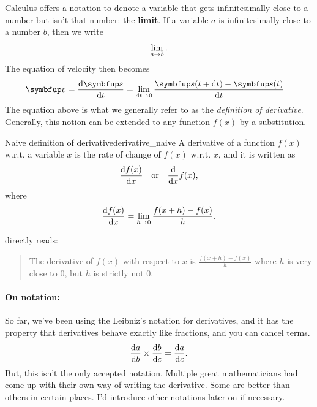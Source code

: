 Calculus offers a notation to denote a variable that gets infinitesimally close to a number but isn't that number: the \textbf{limit}. If a variable \(a\) is infinitesimally close to a number \(b\), then we write
\begin{equation}
  \lim_{a \rightarrow b}.
\end{equation}
The equation of velocity then becomes
\begin{align}
  \vv{v} = \odv{\vv{s}}{t} & = \lim_{\odif{t} \appr 0}\frac{\vv{s}(t + \odif{t}) - \vv{s}(t)}{\odif{t}}
\end{align}
The equation above is what we generally refer to as the \emph{definition of derivative}. Generally, this notion can be extended to any function \(f(x)\) by a substitution.
\begin{df}{Naive definition of derivative}{derivative_naive}
  A derivative of a function \(f(x)\) w.r.t. a variable \(x\) is the rate of change of \(f(x)\) w.r.t. \(x\), and it is written as
  \begin{equation}
    \odv{f(x)}{x} \mathor \odv*{f(x)}{x},
  \end{equation}
  where
  \begin{equation}
    \odv{f(x)}{x} = \lim_{h \appr 0}\frac{f(x + h) - f(x)}{h}.\label{eq:derivatives-derivative_definition}
  \end{equation}
\end{df}
 directly reads:
\begin{quote}
  The derivative of \(f(x)\) with respect to \(x\) is \(\frac{f(x + h) - f(x)}{h}\) where \(h\) is very close to \(0\), but \(h\) is strictly not \(0\).
\end{quote}

\paragraph{On notation:} So far, we've been using the Leibniz's notation for derivatives, and it has the property that derivatives behave exactly like fractions, and you can cancel terms.
\begin{equation}
  \odv{a}{b} \times \odv{b}{c} = \odv{a}{c}.\label{eq:prechainrule}
\end{equation}
But, this isn't the only accepted notation. Multiple great mathematicians had come up with their own way of writing the derivative. Some are better than others in certain places. I'd introduce other notations later on if necessary.

